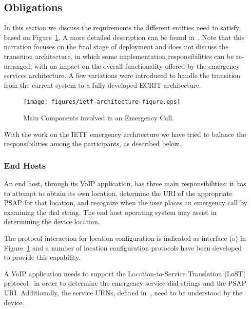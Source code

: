 \documentclass[12pt]{article}
\begin{document}
\subsection{Obligations}

In this section we discuss the requirements the different entities need to satisfy, based on Figure~\ref{ietf-architecture-figure}. A more detailed description can be found in~\cite{draft-ietf-ecrit-phonebcp}. Note that this narration focuses on the final stage of deployment and does not discuss the transition architecture, in which some implementation responsibilities can be re-arranged, with an impact on the overall functionality offered by the emergency services architecture. A few variations were introduced to handle the transition from the current system to a fully developed ECRIT architecture.

\begin{figure}[!t]
 \centering
 \texttt{[image: figures/ietf-architecture-figure.eps]}
 \caption{Main Components involved in an Emergency Call.}
 \label{ietf-architecture-figure}
\end{figure}

With the work on the IETF emergency architecture we have tried to balance the responsibilities among the participants, as described below. 

\subsubsection{End Hosts\\}

An end host, through its VoIP application, has three main responsibilities: it has to attempt to obtain its own location, determine the URI of the appropriate PSAP for that location, and recognize when the user places an emergency call by examining the dial string.  The end host operating system may assist in determining the device location.

The protocol interaction for location configuration is indicated as interface (a) in Figure~\ref{ietf-architecture-figure} and a number of location configuration protocols have been developed to provide this capability.

A VoIP application needs to support the Location-to-Service Translation (LoST) protocol~\cite{rfc5222} in order to determine the emergency service dial strings and the PSAP URI. Additionally, the service URNs, defined in~\cite{rfc5031}, need to be understood by the device.
\end{document}
